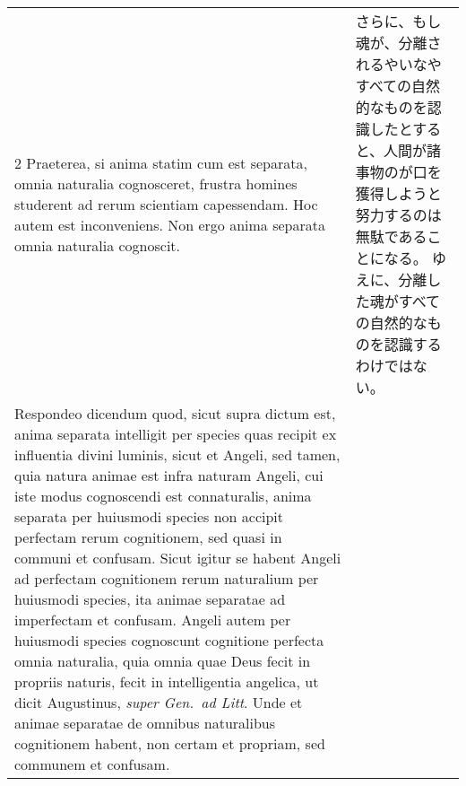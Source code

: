 \documentclass[10pt]{jsarticle} %
\begin{document}
\begin{longtable}{p{21em}p{21em}}
\\




2 {\sc Praeterea}, si anima statim cum est
 separata, omnia naturalia cognosceret, frustra homines studerent ad
 rerum scientiam capessendam.
 Hoc autem est inconveniens. Non ergo anima
 separata omnia naturalia cognoscit.

&

さらに、もし魂が、分離されるやいなやすべての自然的なものを認識したとする
 と、人間が諸事物のが口を獲得しようと努力するのは無駄であることになる。
 ゆえに、分離した魂がすべての自然的なものを認識するわけではない。

\\



{\sc Respondeo dicendum} quod, sicut supra dictum
 est, anima separata intelligit per species quas recipit ex influentia
 divini luminis, sicut et Angeli, sed tamen, quia natura animae est
 infra naturam Angeli, cui iste modus cognoscendi est connaturalis,
 anima separata per huiusmodi species non accipit perfectam rerum
 cognitionem, sed quasi in communi et confusam. Sicut igitur se habent
 Angeli ad perfectam cognitionem rerum naturalium per huiusmodi species,
 ita animae separatae ad imperfectam et confusam. Angeli autem per
 huiusmodi species cognoscunt cognitione perfecta omnia naturalia, quia
 omnia quae Deus fecit in propriis naturis, fecit in intelligentia
 angelica, ut dicit Augustinus, {\it super Gen.~ad Litt}. Unde et animae
 separatae de omnibus naturalibus cognitionem habent, non certam et
 propriam, sed communem et confusam.


\end{longtable}
\end{document}
